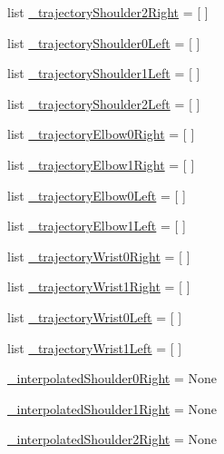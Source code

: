 \begin{DoxyCompactItemize}
list \mbox{\hyperlink{namespacesteering__test_a26286ad2fd27ac40fa98b54e85d55c1a}{\+\_\+trajectory\+Shoulder2\+Right}} = \mbox{[} \mbox{]}
\item 
list \mbox{\hyperlink{namespacesteering__test_a4c3191537a6e37d84d580e451abbb8c3}{\+\_\+trajectory\+Shoulder0\+Left}} = \mbox{[} \mbox{]}
\item 
list \mbox{\hyperlink{namespacesteering__test_ae76ad32f804394c756e3f238008939af}{\+\_\+trajectory\+Shoulder1\+Left}} = \mbox{[} \mbox{]}
\item 
list \mbox{\hyperlink{namespacesteering__test_ace73c51aeac934c1db23829af426bbc6}{\+\_\+trajectory\+Shoulder2\+Left}} = \mbox{[} \mbox{]}
\item 
list \mbox{\hyperlink{namespacesteering__test_a32a4ab0c2cf0285d29f8d5f1f1d0d0ab}{\+\_\+trajectory\+Elbow0\+Right}} = \mbox{[} \mbox{]}
\item 
list \mbox{\hyperlink{namespacesteering__test_a3ef352d982ba6250f03c2531e394301b}{\+\_\+trajectory\+Elbow1\+Right}} = \mbox{[} \mbox{]}
\item 
list \mbox{\hyperlink{namespacesteering__test_aed00810b3482cae22d94c3b36d3b8317}{\+\_\+trajectory\+Elbow0\+Left}} = \mbox{[} \mbox{]}
\item 
list \mbox{\hyperlink{namespacesteering__test_a4fee642ff5298681a263fcb8b4dc21c7}{\+\_\+trajectory\+Elbow1\+Left}} = \mbox{[} \mbox{]}
\item 
list \mbox{\hyperlink{namespacesteering__test_a4c53aab4726e3fab2e67dc17e9795ce8}{\+\_\+trajectory\+Wrist0\+Right}} = \mbox{[} \mbox{]}
\item 
list \mbox{\hyperlink{namespacesteering__test_a208ee65b507cb4532a13dfb5a07b1e1a}{\+\_\+trajectory\+Wrist1\+Right}} = \mbox{[} \mbox{]}
\item 
list \mbox{\hyperlink{namespacesteering__test_a00afd060a7636080215ecf8abba52c9c}{\+\_\+trajectory\+Wrist0\+Left}} = \mbox{[} \mbox{]}
\item 
list \mbox{\hyperlink{namespacesteering__test_a904be5aa8602f45f1d16300f75693654}{\+\_\+trajectory\+Wrist1\+Left}} = \mbox{[} \mbox{]}
\item 
\mbox{\hyperlink{namespacesteering__test_a625347e6acb854d5c24613cf7e973d97}{\+\_\+interpolated\+Shoulder0\+Right}} = None
\item 
\mbox{\hyperlink{namespacesteering__test_a741f1fbd73980897854660aad2e84f32}{\+\_\+interpolated\+Shoulder1\+Right}} = None
\item 
\mbox{\hyperlink{namespacesteering__test_a5dd32d9729d15eb4d8527ca5a3e9db66}{\+\_\+interpolated\+Shoulder2\+Right}} = None

\end{DoxyCompactItemize}
